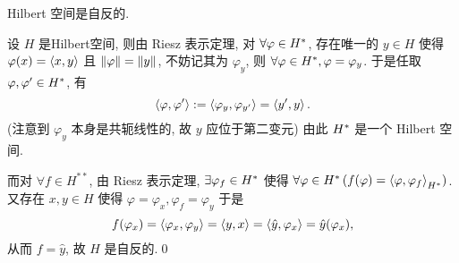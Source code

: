 	\begin{Proposition}
		Hilbert 空间是自反的.
	\end{Proposition}
	\begin{Proof}
		设 $ H $ 是Hilbert空间, 则由 Riesz 表示定理, 对 $ \forall \varphi\in H^{*} $, 存在唯一的 $ y\in H $ 使得 $ \varphi(x)=\left\langle x, y \right\rangle $ 且 $ \left\| \varphi \right\|=\left\| y \right\| $, 不妨记其为 $ \varphi_{y} $, 则 $ \forall \varphi\in H^{*}, \varphi=\varphi_{y} $. 于是任取 $ \varphi, \varphi'\in H^{*} $, 有
		\[
			\left\langle \varphi, \varphi' \right\rangle:=\left\langle \varphi_{y}, \varphi_{y'} \right\rangle=\left\langle y', y \right\rangle.
		\]
		(注意到 $ \varphi_{y} $ 本身是共轭线性的, 故 $ y $ 应位于第二变元) 由此 $ H^{*} $ 是一个 Hilbert 空间.

		而对 $ \forall f\in H^{**} $, 由 Riesz 表示定理, $ \exists\varphi_{f}\in H^{*} $ 使得 $ \forall \varphi\in H^{*}\,(f(\varphi)=\left\langle \varphi, \varphi_{f} \right\rangle_{H^{*}}) $. 又存在 $ x, y\in H $ 使得 $ \varphi=\varphi_{x}, \varphi_{f}=\varphi_{y} $ 于是
		\[
			f(\varphi_{x})=\left\langle \varphi_{x}, \varphi_{y} \right\rangle=\left\langle y, x \right\rangle=\left\langle \hat{y}, \varphi_{x} \right\rangle=\hat{y}(\varphi_{x}),
		\]
		从而 $ f=\hat{y} $, 故 $ H $ 是自反的.\qed
	\end{Proof}